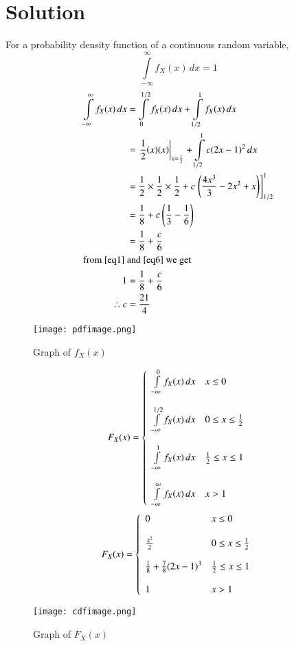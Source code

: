 \documentclass[journal,12pt,twocolumn]{IEEEtran}
\begin{document}
\section*{Solution}
For a probability density function of a continuous random variable, 
\begin{equation}
    \int \limits_{-\infty}^{\infty} f_X(x) \, dx = 1 \label{eq1}
\end{equation}
\begin{align}
    \int \limits_{-\infty}^{\infty} f_X(x) \, dx &=  \int \limits_0^{1/2} f_X(x) \, dx + \int \limits_{1/2}^1 f_X(x) \, dx\\
    &= \left. \frac{1}{2} (x)(x) \right\rvert_{x = \frac{1}{2}} + \int \limits_{1/2}^1 c(2x-1)^2 \, dx\\
    &= \frac{1}{2}\times\frac{1}{2}\times\frac{1}{2} + c{}\left.\left(\frac{4x^3}{3} - 2x^2 + x\right)\right]_{1/2}^1 \\
    &= \frac{1}{8} + c\left(\frac{1}{3} - \frac{1}{6}\right) \\
    &= \frac{1}{8} + \frac{c}{6}  \label{eq6}\\
    \intertext{from \eqref{eq1}  and \eqref{eq6} we get }
    1 &= \frac{1}{8} + \frac{c}{6} \\
    \therefore c &= \frac{21}{4}
\end{align}
\begin{figure}[!ht]
\centering
\texttt{[image: pdfimage.png]}
\caption{Graph of $f_X(x)$}
\end{figure}
\begin{displaymath}
    F_X(x)=\left\{
                    \begin{array}{ll}
                        \int\limits_{-\infty}^0 f_X(x) \, dx & x\leq 0 \\\\
		                \int\limits_{-\infty}^{1/2} f_X(x) \, dx &   0 \leq x \leq \frac{1}{2}  \\\\
		                \int\limits_{-\infty}^1 f_X(x) \, dx & \frac{1}{2} \leq x \leq 1 \\\\
		                \int\limits_{-\infty}^{\infty}  f_X(x) \, dx& x>1\\
	                \end{array}    
                \right.
\end{displaymath}
\begin{displaymath}
    F_X(x)=\left\{
                    \begin{array}{ll}
                        0 & x\leq 0 \\\\
		                \frac{x^2}{2} &   0 \leq x \leq \frac{1}{2}  \\\\
		                \frac{1}{8} + \frac{7}{8} (2x-1)^3 & \frac{1}{2} \leq x \leq 1 \\\\
		                1 & x>1\\
	                \end{array}    
                \right.
\end{displaymath}
\begin{figure}[!ht]
\centering
\texttt{[image: cdfimage.png]}
\caption{Graph of $F_X(x)$}
\end{figure}
\end{document}
